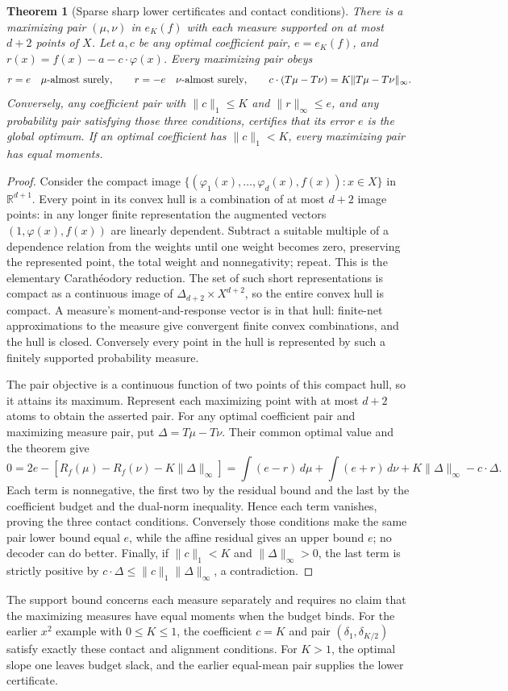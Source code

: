 \documentclass[11pt]{article}
\newtheorem{theorem}{Theorem}
\theoremstyle{definition}
\begin{document}
\begin{theorem}[Sparse sharp lower certificates and contact conditions]
There is a maximizing pair $(\mu,\nu)$ in $e_K(f)$ with each measure
supported on at most $d+2$ points of $X$. Let $a,c$ be any optimal
coefficient pair, $e=e_K(f)$, and
$r(x)=f(x)-a-c\cdot\varphi(x)$. Every maximizing pair obeys
\[
 r=e\quad\mu\hbox{-almost surely},\qquad
 r=-e\quad\nu\hbox{-almost surely},\qquad
 c\cdot(T\mu-T\nu)=K\|T\mu-T\nu\|_\infty.
\]
Conversely, any coefficient pair with $\|c\|_1\leq K$ and
$\|r\|_\infty\leq e$, and any probability pair satisfying those three
conditions, certifies that its error $e$ is the global optimum. If an
optimal coefficient has $\|c\|_1<K$, every maximizing pair has equal
moments.
\end{theorem}
\begin{proof}
Consider the compact image
$\{(\varphi_1(x),\ldots,\varphi_d(x),f(x)):x\in X\}$ in
$\mathbb R^{d+1}$. Every point in its convex hull is a combination of
at most $d+2$ image points: in any longer finite representation the augmented
vectors $(1,\varphi(x),f(x))$ are linearly dependent. Subtract a suitable
multiple of a dependence relation from the weights until one weight becomes
zero, preserving the represented point, the total weight and nonnegativity;
repeat. This is the elementary Carath\'eodory reduction. The set of such
short representations is compact as a continuous image of
$\Delta_{d+2}\times X^{d+2}$, so the entire convex hull is compact.
A measure's moment-and-response vector is in that hull: finite-net
approximations to the measure give convergent finite convex combinations,
and the hull is closed. Conversely every point in the hull is represented
by such a finitely supported probability measure.

The pair objective is a continuous function of two points of this compact
hull, so it attains its maximum. Represent each maximizing point with
at most $d+2$ atoms to obtain the asserted pair. For any optimal coefficient
pair and maximizing measure pair, put $\Delta=T\mu-T\nu$. Their common
optimal value and the theorem give
\[
 0=2e-[R_f(\mu)-R_f(\nu)-K\|\Delta\|_\infty]
   =\int(e-r)\,d\mu+\int(e+r)\,d\nu
                        +K\|\Delta\|_\infty-c\cdot\Delta.
\]
Each term is nonnegative, the first two by the residual bound and the last
by the coefficient budget and the dual-norm inequality. Hence each term
vanishes, proving the three contact conditions. Conversely those conditions
make the same pair lower bound equal $e$, while the affine residual gives
an upper bound $e$; no decoder can do better. Finally, if
$\|c\|_1<K$ and $\|\Delta\|_\infty>0$, the last term is strictly positive
by $c\cdot\Delta\leq\|c\|_1\|\Delta\|_\infty$, a contradiction.
\end{proof}
The support bound concerns each measure separately and requires no claim
that the maximizing measures have equal moments when the budget binds.
For the earlier $x^2$ example with $0\leq K\leq1$, the coefficient
$c=K$ and pair $(\delta_1,\delta_{K/2})$ satisfy exactly these contact and
alignment conditions. For $K>1$, the optimal slope one leaves budget slack,
and the earlier equal-mean pair supplies the lower certificate.
\end{document}
